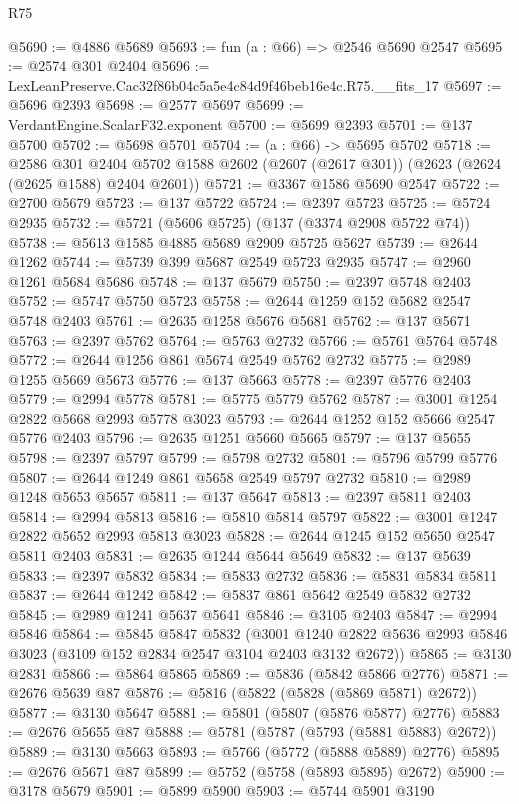 \begin{lexlean}{R75}
\begin{coremodule}
@5690 := @4886 @5689
@5693 := fun (a : @66) => @2546 @5690 @2547
@5695 := @2574 @301 @2404
@5696 := LexLeanPreserve.Cac32f86b04c5a5e4c84d9f46beb16e4c.R75.__fits_17
@5697 := @5696 @2393
@5698 := @2577 @5697
@5699 := VerdantEngine.ScalarF32.exponent
@5700 := @5699 @2393
@5701 := @137 @5700
@5702 := @5698 @5701
@5704 := (a : @66) -> @5695 @5702
@5718 := @2586
    @301
    @2404
    @5702
    @1588
    @2602
    (@2607 (@2617 @301))
    (@2623 (@2624 (@2625 @1588) @2404 @2601))
@5721 := @3367 @1586 @5690 @2547
@5722 := @2700 @5679
@5723 := @137 @5722
@5724 := @2397 @5723
@5725 := @5724 @2935
@5732 := @5721 (@5606 @5725) (@137 (@3374 @2908 @5722 @74))
@5738 := @5613 @1585 @4885 @5689 @2909 @5725 @5627
@5739 := @2644 @1262
@5744 := @5739 @399 @5687 @2549 @5723 @2935
@5747 := @2960 @1261 @5684 @5686
@5748 := @137 @5679
@5750 := @2397 @5748 @2403
@5752 := @5747 @5750 @5723
@5758 := @2644 @1259 @152 @5682 @2547 @5748 @2403
@5761 := @2635 @1258 @5676 @5681
@5762 := @137 @5671
@5763 := @2397 @5762
@5764 := @5763 @2732
@5766 := @5761 @5764 @5748
@5772 := @2644 @1256 @861 @5674 @2549 @5762 @2732
@5775 := @2989 @1255 @5669 @5673
@5776 := @137 @5663
@5778 := @2397 @5776 @2403
@5779 := @2994 @5778
@5781 := @5775 @5779 @5762
@5787 := @3001 @1254 @2822 @5668 @2993 @5778 @3023
@5793 := @2644 @1252 @152 @5666 @2547 @5776 @2403
@5796 := @2635 @1251 @5660 @5665
@5797 := @137 @5655
@5798 := @2397 @5797
@5799 := @5798 @2732
@5801 := @5796 @5799 @5776
@5807 := @2644 @1249 @861 @5658 @2549 @5797 @2732
@5810 := @2989 @1248 @5653 @5657
@5811 := @137 @5647
@5813 := @2397 @5811 @2403
@5814 := @2994 @5813
@5816 := @5810 @5814 @5797
@5822 := @3001 @1247 @2822 @5652 @2993 @5813 @3023
@5828 := @2644 @1245 @152 @5650 @2547 @5811 @2403
@5831 := @2635 @1244 @5644 @5649
@5832 := @137 @5639
@5833 := @2397 @5832
@5834 := @5833 @2732
@5836 := @5831 @5834 @5811
@5837 := @2644 @1242
@5842 := @5837 @861 @5642 @2549 @5832 @2732
@5845 := @2989 @1241 @5637 @5641
@5846 := @3105 @2403
@5847 := @2994 @5846
@5864 := @5845
    @5847
    @5832
    (@3001 @1240 @2822 @5636 @2993 @5846 @3023 (@3109 @152 @2834 @2547 @3104 @2403 @3132 @2672))
@5865 := @3130 @2831
@5866 := @5864 @5865
@5869 := @5836 (@5842 @5866 @2776)
@5871 := @2676 @5639 @87
@5876 := @5816 (@5822 (@5828 (@5869 @5871) @2672))
@5877 := @3130 @5647
@5881 := @5801 (@5807 (@5876 @5877) @2776)
@5883 := @2676 @5655 @87
@5888 := @5781 (@5787 (@5793 (@5881 @5883) @2672))
@5889 := @3130 @5663
@5893 := @5766 (@5772 (@5888 @5889) @2776)
@5895 := @2676 @5671 @87
@5899 := @5752 (@5758 (@5893 @5895) @2672)
@5900 := @3178 @5679
@5901 := @5899 @5900
@5903 := @5744 @5901 @3190

\end{coremodule}
\end{lexlean}
